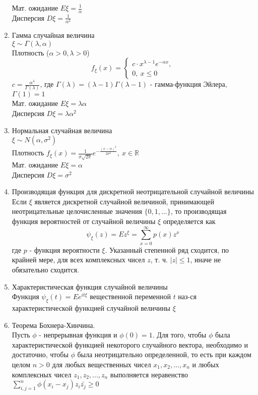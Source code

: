 \documentclass[a4paper, 12pt]{article}
\begin{document}
\begin{enumerate}
    Мат. ожидание $E\xi=\frac{1}{\alpha}$\\
    Дисперсия $D\xi=\frac{1}{\alpha^2}$
    \item Гамма случайная величина\\
    $\xi\sim \Gamma(\lambda, \alpha)$\\
    Плотность ($\alpha>0, \lambda>0$)
    \begin{equation*}
        f_\xi(x)=
        \begin{cases}
            c\cdot x^{\lambda-1}e^{-\alpha x},\\
            0,\ x\leq0
        \end{cases}
    \end{equation*}
    $c=\frac{\alpha^\lambda}{\Gamma(\lambda)}$, где $\Gamma(\lambda)=(\lambda-1)\Gamma(\lambda-1)$ - гамма-функция Эйлера, $\Gamma(1)=1$\\
    Мат. ожидание $E\xi=\lambda\alpha$\\
    Дисперсия $D\xi=\lambda\alpha^2$
    \item Нормальная случайная величина\\
    $\xi\sim N(\alpha, \sigma^2)$\\
    Плотность $f_\xi(x)=\frac{1}{\sigma\sqrt{2\pi}} e^{-\frac{(x-\alpha)^2}{2\sigma^2}},\ x \in\mathbb{R}$\\
    Мат. ожидание $E\xi=\alpha$\\
    Дисперсия $D\xi=\sigma^2$
    
    \item Производящая функция для дискретной неотрицательной случайной величины\\
    Если $\xi$ является дискретной случайной величиной, принимающей неотрицательные целочисленные значения $\{0,1,...\}$, то производящая функция вероятностей от случайной величины $\xi$ определяется как
    \[ \psi_\xi(z)=Ez^\xi=\sum\limits_{x=0}^{\infty} p(x)z^x\]
    где $p$ - функция вероятности $\xi$. Указанный степенной ряд сходится, по крайней мере, для всех комплексных чисел $z$, т. ч. $|z|\leq 1$, иначе не обязательно сходится.
    \item Характеристическая функция случайной величины\\
    Функция $\psi_\xi(t)=Ee^{it\xi}$ вещественной переменной $t$ наз-ся характеристической функцией случайной величины $\xi$
    
    \item Теорема Бохнера-Хинчина.\\
    Пусть $\phi$ - непрерывная функция и $\phi(0)=1$. Для того, чтобы $\phi$ была характеристической функцией некоторого случайного вектора, необходимо и достаточно, чтобы $\phi$ была неотрицательно определенной, то есть при каждом целом $n>0$ для любых вещественных чисел $x_1,x_2,...,x_n$ и любых комплексных чисел $z_1,z_2,...,z_n$ выполняется неравенство $\sum\limits_{i,j=1}^n \phi(x_i-x_j)z_i\bar{z_j}\geq 0$
    

\end{enumerate}
\end{document}
